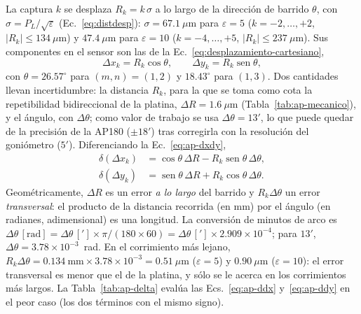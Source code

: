 \documentclass[letterpaper,12pt,oneside]{book}
\DeclareMathOperator{\sen}{sen} %
\begin{document}
La captura $k$ se desplaza $R_k = k\,\sigma$ a lo largo de la dirección de barrido
$\theta$, con $\sigma = P_L/\sqrt{\varepsilon}$ (Ec.~\ref{eq:distdesp}): $\sigma =
67.1~\mu$m para $\varepsilon = 5$ ($k = -2,\dots,+2$, $|R_k| \le 134~\mu$m) y
$47.4~\mu$m para $\varepsilon = 10$ ($k = -4,\dots,+5$, $|R_k| \le 237~\mu$m). Sus
componentes en el sensor son las de la Ec.~\ref{eq:desplazamiento-cartesiano},
\begin{equation}
\Delta x_k = R_k \cos\theta, \qquad \Delta y_k = R_k \sen\theta ,
\label{eq:ap-dxdy}
\end{equation}
con $\theta = 26.57^\circ$ para $(m,n) = (1,2)$ y $18.43^\circ$ para $(1,3)$. Dos
cantidades llevan incertidumbre: la distancia $R_k$, para la que se toma como cota la
repetibilidad bidireccional de la platina, $\Delta R = 1.6~\mu$m
(Tabla~\ref{tab:ap-mecanico}), y el ángulo, con $\Delta\theta$; como valor de trabajo se
usa $\Delta\theta = 13'$, lo que puede quedar de la precisión de la AP180 ($\pm 18'$)
tras corregirla con la resolución del goniómetro ($5'$). Diferenciando la
Ec.~\ref{eq:ap-dxdy},
\begin{align}
\delta(\Delta x_k) &= \cos\theta\,\Delta R - R_k \sen\theta\,\Delta\theta, \label{eq:ap-ddx}\\
\delta(\Delta y_k) &= \sen\theta\,\Delta R + R_k \cos\theta\,\Delta\theta . \label{eq:ap-ddy}
\end{align}
Geométricamente, $\Delta R$ es un error \emph{a lo largo} del barrido y $R_k\Delta\theta$
un error \emph{transversal}: el producto de la distancia recorrida (en mm) por el ángulo
(en radianes, adimensional) es una longitud. La conversión de minutos de arco es
$\Delta\theta\,[\text{rad}] = \Delta\theta\,['] \times \pi/(180\times 60) = \Delta\theta\,[']
\times 2.909\times10^{-4}$; para $13'$, $\Delta\theta = 3.78\times10^{-3}$~rad. En el
corrimiento más lejano, $R_k\Delta\theta = 0.134~\text{mm}\times 3.78\times10^{-3} =
0.51~\mu$m ($\varepsilon = 5$) y $0.90~\mu$m ($\varepsilon = 10$): el error transversal es
menor que el de la platina, y sólo se le acerca en los corrimientos más largos. La
Tabla~\ref{tab:ap-delta} evalúa las Ecs.~\ref{eq:ap-ddx} y~\ref{eq:ap-ddy} en el peor
caso (los dos términos con el mismo signo).
\end{document}

